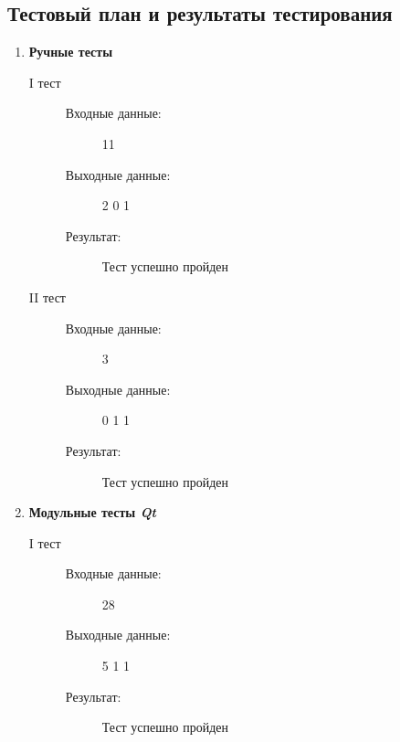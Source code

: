 \documentclass[12pt,a4paper]{report}
\begin{document}
\subsection{Тестовый план и результаты тестирования}
\begin{enumerate}
\item \textbf{Ручные тесты}
\begin{description}
\item[I тест]
\hspace{\parindent}
\begin{flushleft}
\begin{description}
\item[Входные данные:] 11
\item[Выходные данные:] 2 0 1
\item[Результат:] Тест успешно пройден
\end{description}
\end{flushleft}
\end{description}

\begin{description}
\item[II тест]
\hspace{\parindent}
\begin{flushleft}
\begin{description}
\item[Входные данные:] 3
\item[Выходные данные:] 0 1 1
\item[Результат:] Тест успешно пройден
\end{description}
\end{flushleft}
\end{description}

\item \textbf{Модульные тесты \textit{Qt}}
\begin{description}
\item[I тест]
\hspace{\parindent}
\begin{flushleft}
\begin{description}
\item[Входные данные:] 28
\item[Выходные данные:] 5 1 1
\item[Результат:] Тест успешно пройден
\end{description}
\end{flushleft}
\end{description}


\end{enumerate}
\end{document}
